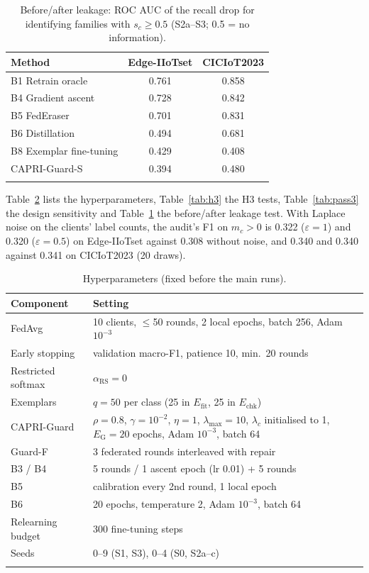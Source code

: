 \documentclass[pdflatex,sn-mathphys-num,iicol]{sn-jnl}
\newcommand{\Efit}{E_{\mathrm{fit}}}
\newcommand{\Echk}{E_{\mathrm{chk}}}
\begin{document}
\begin{appendices}
\begin{table}[!htbp]
\caption{Before/after leakage: ROC AUC of the recall drop for identifying families with $s_c\ge0.5$ (S2a--S3; 0.5 = no information).}\label{tab:leak}
\footnotesize
\begin{tabular*}{\textwidth}{@{\extracolsep\fill}lcc}
\toprule
Method & Edge-IIoTset & CICIoT2023 \\
\midrule
B1 Retrain oracle & 0.761 & 0.858 \\
B4 Gradient ascent & 0.728 & 0.842 \\
B5 FedEraser & 0.701 & 0.831 \\
B6 Distillation & 0.494 & 0.681 \\
B8 Exemplar fine-tuning & 0.429 & 0.408 \\
CAPRI-Guard-S & 0.394 & 0.480 \\
\botrule
\end{tabular*}
\end{table}

Table~\ref{tab:hyper} lists the hyperparameters, Table~\ref{tab:h3} the H3 tests, Table~\ref{tab:pass3} the design sensitivity and Table~\ref{tab:leak} the before/after leakage test. With Laplace noise on the clients' label counts, the audit's F1 on $m_c>0$ is 0.322 ($\varepsilon=1$) and 0.320 ($\varepsilon=0.5$) on Edge-IIoTset against 0.308 without noise, and 0.340 and 0.340 against 0.341 on CICIoT2023 (20 draws).

\begin{table}[!htbp]
\caption{Hyperparameters (fixed before the main runs).}\label{tab:hyper}
\scriptsize
\begin{tabular*}{\textwidth}{@{}p{1.9cm}p{5.4cm}@{}}
\toprule
Component & Setting \\
\midrule
FedAvg & 10 clients, $\le$50 rounds, 2 local epochs, batch 256, Adam $10^{-3}$ \\
Early stopping & validation macro-F1, patience 10, min.\ 20 rounds \\
Restricted softmax & $\alpha_{\mathrm{RS}}=0$~\cite{li2021fedrs} \\
Exemplars & $q=50$ per class (25 in $\Efit$, 25 in $\Echk$) \\
CAPRI-Guard & $\rho=0.8$, $\gamma=10^{-2}$, $\eta=1$, $\lambda_{\max}=10$, $\lambda_c$ initialised to 1, $E_{\mathrm{G}}=20$ epochs, Adam $10^{-3}$, batch 64 \\
Guard-F & 3 federated rounds interleaved with repair \\
B3 / B4 & 5 rounds / 1 ascent epoch (lr 0.01) + 5 rounds \\
B5 & calibration every 2nd round, 1 local epoch \\
B6 & 20 epochs, temperature 2, Adam $10^{-3}$, batch 64 \\
Relearning budget & 300 fine-tuning steps \\
Seeds & 0--9 (S1, S3), 0--4 (S0, S2a--c) \\
\botrule
\end{tabular*}
\end{table}


\end{appendices}
\end{document}
